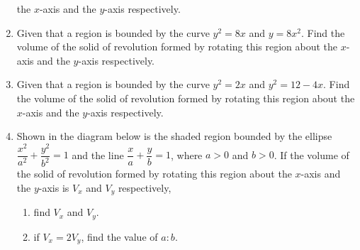 \begin{enumerate}[resume]
            the $x$-axis and the $y$-axis respectively.
      \item Given that a region is bounded by the curve $y^2=8 x$ and $y=8 x^2$. Find the
            volume of the solid of revolution formed by rotating this region about the
            $x$-axis and the $y$-axis respectively.
      \item Given that a region is bounded by the curve $y^2=2 x$ and $y^2=12-4 x$. Find
            the volume of the solid of revolution formed by rotating this region about the
            $x$-axis and the $y$-axis respectively.
      \item Shown in the diagram below is the shaded region bounded by the ellipse
            $\dfrac{x^2}{a^2} + \dfrac{y^2}{b^2} = 1$ and the line $\dfrac{x}{a} +
                  \dfrac{y}{b} = 1$, where $a > 0$ and $b > 0$. If the volume of the solid of
            revolution formed by rotating this region about the $x$-axis and the $y$-axis
            is $V_x$ and $V_y$ respectively,
            \begin{enumerate}
                  \item find $V_x$ and $V_y$.
                  \item if $V_x = 2V_y$, find the value of $a:b$.
            \end{enumerate}

\end{enumerate}